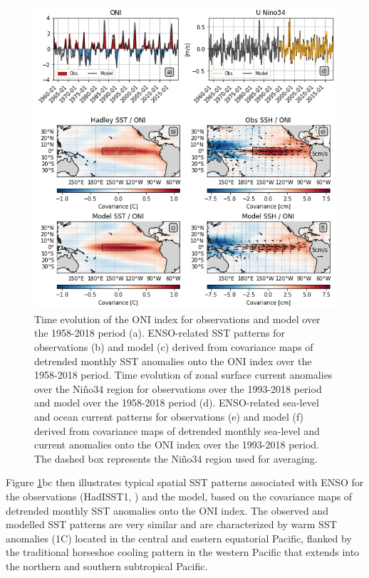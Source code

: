 \begin{figure}[h!tp]
	\centering
	\includegraphics[scale=0.6]{figs/fig1.png}
	\caption{Time evolution of the ONI index for observations and model over the 1958-2018 period (a). ENSO-related SST patterns for observations \citep{raynerGlobalAnalysesSea2003} (b) and model (c) derived from covariance maps of detrended monthly SST anomalies onto the ONI index over the 1958-2018 period. Time evolution of zonal surface current anomalies over the Niño34 region for observations over the 1993-2018 period \citep{rioGOCEOceanCirculation2014} and model over the 1958-2018 period (d). ENSO-related sea-level and ocean current patterns for observations (e) and model (f) derived from covariance maps of detrended monthly sea-level and current anomalies onto the ONI index over the 1993-2018 period. The dashed box represents the Niño34 region used for averaging.}
	\label{fig:nemo-had-sst}
\end{figure}

Figure \ref{fig:nemo-had-sst}bc then illustrates typical spatial SST patterns associated with ENSO for the observations (HadISST1, \citealp{raynerGlobalAnalysesSea2003}) and the model, based on the covariance maps of detrended monthly SST anomalies onto the ONI index. The observed and modelled SST patterns are very similar and are characterized by warm SST anomalies (1\degree{}C) located in the central and eastern equatorial Pacific, flanked by the traditional horseshoe cooling pattern in the western Pacific that extends into the northern and southern subtropical Pacific.    


